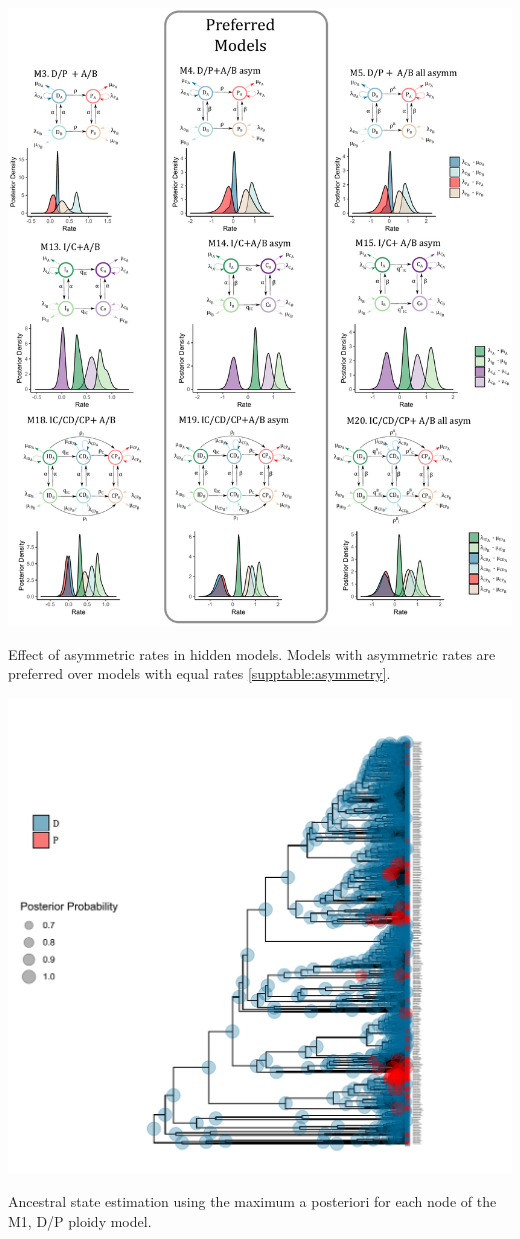 \begin{suppfigure}
\includegraphics[width=\textwidth]{effectofasymmetry.pdf}
\caption{Effect of asymmetric rates in hidden models. Models with asymmetric rates are preferred over models with equal rates \cref{supptable:asymmetry}. } %
\label{suppfigure:asymmetric}
\end{suppfigure}


\begin{suppfigure}
\includegraphics[width=\textwidth]{asrDP.pdf}
\caption{Ancestral state estimation using the maximum a posteriori for each node of the M1, D/P ploidy model. } %
\label{suppfigure:DPnodipasr}
\end{suppfigure}

